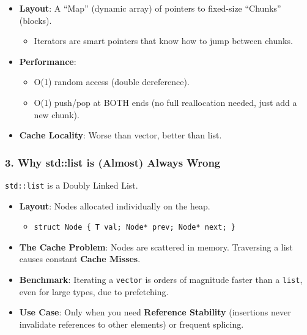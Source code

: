 \begin{itemize}
\tightlist
\item
  \textbf{Layout}: A ``Map'' (dynamic array) of pointers to fixed-size
  ``Chunks'' (blocks).

  \begin{itemize}
  \tightlist
  \item
    Iterators are smart pointers that know how to jump between chunks.
  \end{itemize}
\item
  \textbf{Performance}:

  \begin{itemize}
  \tightlist
  \item
    O(1) random access (double dereference).
  \item
    O(1) push/pop at BOTH ends (no full reallocation needed, just add a
    new chunk).
  \end{itemize}
\item
  \textbf{Cache Locality}: Worse than vector, better than list.
\end{itemize}

\hypertarget{why-stdlist-is-almost-always-wrong}{%
\subsubsection{3. Why std::list is (Almost) Always
Wrong}\label{why-stdlist-is-almost-always-wrong}}

\passthrough{\lstinline!std::list!} is a Doubly Linked List.

\begin{itemize}
\tightlist
\item
  \textbf{Layout}: Nodes allocated individually on the heap.

  \begin{itemize}
  \tightlist
  \item
    \passthrough{\lstinline!struct Node \{ T val; Node* prev; Node* next; \}!}
  \end{itemize}
\item
  \textbf{The Cache Problem}: Nodes are scattered in memory. Traversing
  a list causes constant \textbf{Cache Misses}.
\item
  \textbf{Benchmark}: Iterating a \passthrough{\lstinline!vector!} is
  orders of magnitude faster than a \passthrough{\lstinline!list!}, even
  for large types, due to prefetching.
\item
  \textbf{Use Case}: Only when you need \textbf{Reference Stability}
  (insertions never invalidate references to other elements) or frequent
  splicing.
\end{itemize}

